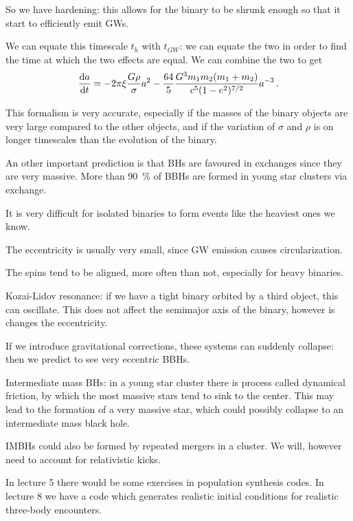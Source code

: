 \documentclass[main.tex]{subfiles}
\begin{document}
So we have hardening: this allows for the binary to be shrunk enough so that it start to efficiently emit GWs. 

We can equate this timescale \(t_h\) with \(t_{GW}\): we can equate the two in order to find the time at which the two effects are equal. We can combine the two to get 
%
\begin{align}
\dv{a}{t} = - 2 \pi \xi \frac{G \rho }{\sigma }a^2 - \frac{64}{5} \frac{G^3 m_1 m_2 (m_1 +m_2 )}{c^{5} (1-e^2)^{7/2}} a^{-3}
\,.
\end{align}

This formalism is very accurate, especially if the masses of the binary objects are very large compared to the other objects, and if the variation of \(\sigma \) and \(\rho \) is on longer timescales than the evolution of the binary. 

An other important prediction is that BHs are favoured in exchanges since they are very massive.
More than \SI{90}{\percent} of BBHs are formed in young star clusters via exchange. 

It is very difficult for isolated binaries to form events like the heaviest ones we know. 

The eccentricity is usually very small, since GW emission causes circularization. 

The spins tend to be aligned, more often than not, especially for heavy binaries. 

Kozai-Lidov resonance: if we have a tight binary orbited by a third object, this can oscillate. 
This does not affect the semimajor axis of the binary, however is changes the eccentricity. 

If we introduce gravitational corrections, these systems can suddenly collapse: then we predict to see very eccentric BBHs. 

Intermediate mass BHs: in a young star cluster there is  process called dynamical friction, by which the most massive stars tend to sink to the center. 
This may lead to the formation of a very massive star, which could possibly collapse to an intermediate mass black hole. 

IMBHs could also be formed by repeated mergers in a cluster. 
We will, however need to account for relativistic kicks. 

In lecture 5 there would be some exercises in population synthesis codes.
In lecture 8 we have a code which generates realistic initial conditions for realistic three-body encounters. 
\end{document}
